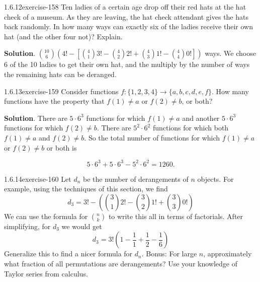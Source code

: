 \documentclass[twoside,11pt,]{book}
\numberwithin{equation}{chapter}
\begin{document}
\begin{divisionsolution}{1.6.12}{}{exercise-158}%
\hypertarget{p-2589}{}%
Ten ladies of a certain age drop off their red hats at the hat check of a museum. As they are leaving, the hat check attendant gives the hats back randomly. In how many ways can exactly six of the ladies receive their own hat (and the other four not)? Explain.%
\par\smallskip%
\noindent\textbf{Solution}.\quad%
\hypertarget{p-2591}{}%
\({10 \choose 6}\left(4! - \left[{4 \choose 1} 3! - {4 \choose 2}2! + {4 \choose 3}1! - {4 \choose 4}0!\right]\right)\) ways. We choose 6 of the 10 ladies to get their own hat, and the multiply by the number of ways the remaining hats can be deranged.%
\end{divisionsolution}%
\begin{divisionsolution}{1.6.13}{}{exercise-159}%
\hypertarget{p-2595}{}%
Consider functions \(f: \{1,2,3,4\} \to \{a,b,c,d,e,f\}\text{.}\) How many functions have the property that \(f(1) \ne a\) or \(f(2) \ne b\text{,}\) or both?%
\par\smallskip%
\noindent\textbf{Solution}.\quad%
\hypertarget{p-2597}{}%
There are \(5 \cdot 6^3\) functions for which \(f(1) \ne a\) and another \(5 \cdot 6^3\) functions for which \(f(2) \ne b\text{.}\) There are \(5^2 \cdot 6^2\) functions for which both \(f(1) \ne a\) and \(f(2) \ne b\text{.}\) So the total number of functions for which \(f(1) \ne a\) or \(f(2) \ne b\) or both is%
\par
\hypertarget{p-2598}{}%
%
\begin{equation*}
5 \cdot 6^3 + 5 \cdot 6^3 - 5^2 \cdot 6^2 = 1260
\text{.}
\end{equation*}
%
\end{divisionsolution}%
\begin{divisionsolution}{1.6.14}{}{exercise-160}%
\hypertarget{p-2599}{}%
Let \(d_n\) be the number of derangements of \(n\) objects. For example, using the techniques of this section, we find%
\begin{equation*}
d_3 = 3!-\left({3 \choose 1}2! - {3 \choose 2}1! + {3 \choose 3}0! \right)
\end{equation*}
We can use the formula for \({n \choose k}\) to write this all in terms of factorials. After simplifying, for \(d_3\) we would get%
\begin{equation*}
d_3 = 3!\left(1 - \frac{1}{1} + \frac{1}{2} - \frac{1}{6} \right)
\end{equation*}
Generalize this to find a nicer formula for \(d_n\). Bonus: For large \(n\), approximately what fraction of all permutations are derangements? Use your knowledge of Taylor series from calculus.%
\end{divisionsolution}%
\end{document}
